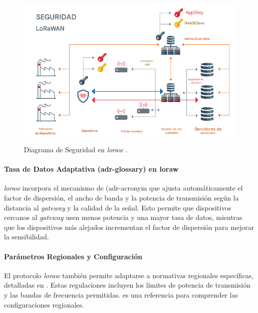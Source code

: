 \begin{figure}[H]
\leavevmode
\begin{minipage}{\textwidth}
\begin{center}
\includegraphics[scale=0.6]{./capitulo_02/figures/Lorasec.png}
\caption{Diagrama de Seguridad en \textit{\acrshort{loraw}} \cite{lorawan_security_whitepaper}. \label{fig:seclora}}
\end{center}
\end{minipage}
\end{figure}



\paragraph{Tasa de Datos Adaptativa (\gls{adr-glossary}) en \acrshort{loraw}\\}
\textit{\acrshort{loraw}} incorpora el mecanismo de (\gls{adr-acronym} que ajusta automáticamente el factor de dispersión, el ancho de banda y la potencia de transmisión según la distancia al \textit{gateway} y la calidad de la señal. Esto permite que dispositivos cercanos al \textit{gateway} usen menos potencia y una mayor tasa de datos, mientras que los dispositivos más alejados incrementan el factor de dispersión para mejorar la sensibilidad.


\paragraph{Parámetros Regionales y Configuración\\}
El protocolo \textit{\acrshort{loraw}} también permite adaptarse a normativas regionales específicas, detalladas en \cite{doc_regionalparameters}. Estas regulaciones incluyen los límites de potencia de transmisión y las bandas de frecuencia permitidas. \cite{doc_frequencyplans} es una referencia para comprender las configuraciones regionales. \\

